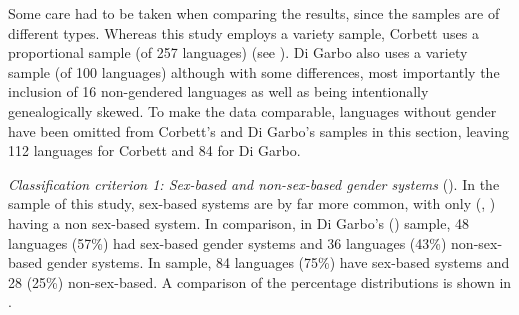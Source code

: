 \documentclass[output=collectionpaper]{langsci/langscibook}
\begin{document}
Some care had to be taken when comparing the results, since the samples are of different types. Whereas this study employs a variety sample, Corbett uses a proportional sample (of 257 languages) (see ). Di Garbo also uses a variety sample (of 100 languages) although with some differences, most importantly the inclusion of 16 non-gendered languages as well as being intentionally genealogically skewed. To make the data comparable, languages without gender have been omitted from Corbett's and Di Garbo's samples in this section, leaving 112 languages for Corbett and 84 for Di Garbo.



\textit{Classification criterion 1: Sex-based and non-sex-based gender systems} ().
In the sample of this study, sex-based
 systems are by far more common, with only  (, ) having a non sex-based system. In comparison, in Di Garbo's (\citeyear[63]{DiGarbo2014}) sample, 48 languages (57\%) had sex-based gender systems and 36 languages (43\%) non-sex-based gender systems. In  sample, 84 languages (75\%) have sex-based systems and 28 (25\%) non-sex-based. A comparison of the percentage distributions is shown in .
\end{document}
